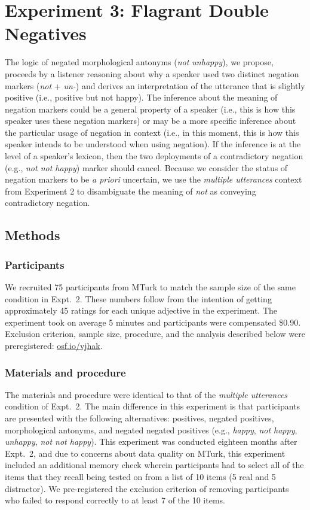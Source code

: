 \documentclass[floatsintext,doc]{apa6}
\begin{document}
\section{Experiment 3: Flagrant Double Negatives}\label{experiment-3-notnot}

The logic of negated morphological antonyms (\emph{not unhappy}), we propose, proceeds by a listener reasoning about why a speaker used two distinct negation markers (\emph{not} + \emph{un-}) and derives an interpretation of the utterance that is slightly positive (i.e., positive but not happy). 
The inference about the meaning of negation markers could be a general property of a speaker (i.e., this is how this speaker uses these negation markers) or may be a more specific inference about the particular usage of negation in context (i.e., in this moment, this is how this speaker intends to be understood when using negation). 
If the inference is at the level of a speaker's lexicon, then the two deployments of a contradictory negation (e.g., \emph{not not happy}) marker should cancel. 
Because we consider the status of negation markers to be \emph{a priori} uncertain, we use the \emph{multiple utterances} context from Experiment 2 to disambiguate the meaning of \emph{not} as conveying contradictory negation. 

\subsection{Methods}

\subsubsection{Participants}\label{participants-3}

We recruited 75 participants from MTurk to match the sample size of the same condition in Expt.~2.
These numbers follow from the intention of getting approximately 45 ratings for each unique adjective in the experiment.
The experiment took on average 5 minutes and participants were compensated \$0.90.
Exclusion criterion, sample size, procedure, and the analysis described below were preregistered: \url{osf.io/vjhak}.

\subsubsection{Materials and procedure}\label{materials-3}

The materials and procedure were identical to that of the \emph{multiple utterances} condition of Expt.~2.
The main difference in this experiment is that participants are presented with the following alternatives: positives, negated positives, morphological antonyms, and negated negated positives (e.g., \emph{happy}, \emph{not happy}, \emph{unhappy}, \emph{not not happy}).
This experiment was conducted eighteen months after Expt.~2, and due to concerns about data quality on MTurk, this experiment included an additional memory check wherein participants had to select all of the items that they recall being tested on from a list of 10 items (5 real and 5 distractor). 
We pre-registered the exclusion criterion of removing participants who failed to respond correctly to at least 7 of the 10 items. 
\end{document}
